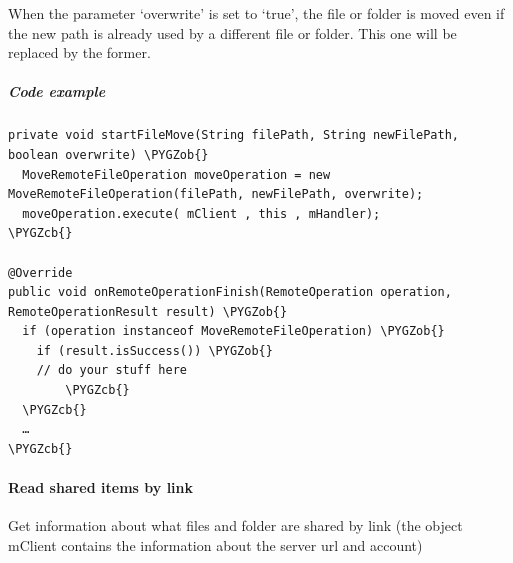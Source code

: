 \documentclass[letterpaper,10pt,english]{sphinxmanual}
\def\PYGZob{\char`\{}
\def\PYGZcb{\char`\}}
\begin{document}
When the parameter `overwrite' is set to `true', the file or folder is moved even if the new path is already
used by a different file or folder. This one will be replaced by the former.


\subparagraph{Code example}
\label{android_library/examples:id8}
\begin{Verbatim}[commandchars=\\\{\}]
private void startFileMove(String filePath, String newFilePath, boolean overwrite) \PYGZob{}
  MoveRemoteFileOperation moveOperation = new MoveRemoteFileOperation(filePath, newFilePath, overwrite);
  moveOperation.execute( mClient , this , mHandler);
\PYGZcb{}

@Override
public void onRemoteOperationFinish(RemoteOperation operation, RemoteOperationResult result) \PYGZob{}
  if (operation instanceof MoveRemoteFileOperation) \PYGZob{}
    if (result.isSuccess()) \PYGZob{}
    // do your stuff here
        \PYGZcb{}
  \PYGZcb{}
  …
\PYGZcb{}
\end{Verbatim}


\paragraph{Read shared items by link}
\label{android_library/examples:read-shared-items-by-link}
Get information about what files and folder are shared by link (the object
mClient contains the information about the server url and account)
\end{document}

